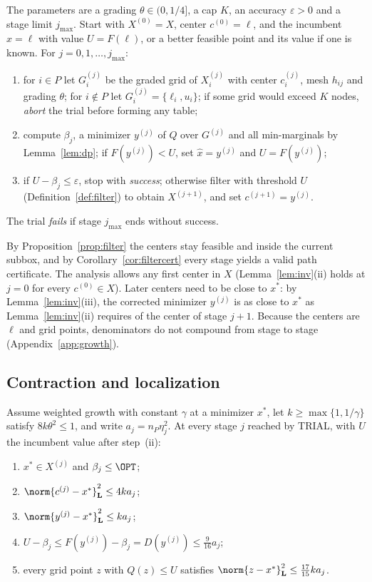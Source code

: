 \begin{algorithm}\label{alg:trial}
The parameters are a grading $\theta\in(0,1/4]$, a cap $K$, an accuracy
$\varepsilon>0$ and a stage limit $j_{\max}$. Start with $X^{(0)}=X$, center
$c^{(0)}=\ell$, and the incumbent $\hat x=\ell$ with value $U=F(\ell)$, or a
better feasible point and its value if one is known. For
$j=0,1,\dots,j_{\max}$:
\begin{enumerate}[label=(\roman*)]
\item for $i\in P$ let $G_i^{(j)}$ be the graded grid of $X_i^{(j)}$ with
center $c_i^{(j)}$, mesh $h_{ij}$ and grading $\theta$; for $i\notin P$ let
$G_i^{(j)}=\{\ell_i,u_i\}$; if some grid would exceed $K$ nodes,
\emph{abort} the trial before forming any table;
\item compute $\beta_j$, a minimizer $y^{(j)}$ of $Q$ over $G^{(j)}$ and all
min-marginals by Lemma~\ref{lem:dp}; if $F(y^{(j)})<U$, set
$\hat x=y^{(j)}$ and $U=F(y^{(j)})$;
\item if $U-\beta_j\le\varepsilon$, stop with \emph{success}; otherwise
filter with threshold $U$ (Definition~\ref{def:filter}) to obtain
$X^{(j+1)}$, and set $c^{(j+1)}=y^{(j)}$.
\end{enumerate}
The trial \emph{fails} if stage $j_{\max}$ ends without success.
\end{algorithm}

By Proposition~\ref{prop:filter} the centers stay feasible and inside the
current subbox, and by Corollary~\ref{cor:filtercert} every stage yields a
valid path certificate. The analysis allows any first center in $X$
(Lemma~\ref{lem:inv}(ii) holds at $j=0$ for every $c^{(0)}\in X$). Later
centers need to be close to $x^*$: by Lemma~\ref{lem:inv}(iii), the corrected
minimizer $y^{(j)}$ is as close to $x^*$ as Lemma~\ref{lem:inv}(ii) requires
of the center of stage $j+1$. Because the centers are $\ell$ and grid points,
denominators do not compound from stage to stage
(Appendix~\ref{app:growth}).

\subsection{Contraction and localization}

\begin{lemma}\label{lem:inv}
Assume weighted growth with constant $\gamma$ at a minimizer $x^*$, let
$k\ge\max\{1,1/\gamma\}$ satisfy $8k\theta^2\le1$, and write
$a_j=n_P\eta_j^2$. At every stage $j$ reached by TRIAL, with $U$ the
incumbent value after step~(ii):
\begin{enumerate}[label=(\roman*)]
\item $x^*\in X^{(j)}$ and $\beta_j\le\OPT$;
\item $\norm{c^{(j)}-x^*}_{\mathbf L}^2\le4ka_j$;
\item $\norm{y^{(j)}-x^*}_{\mathbf L}^2\le ka_j$;
\item $U-\beta_j\le F(y^{(j)})-\beta_j=D(y^{(j)})\le\frac9{16}a_j$;
\item every grid point $z$ with $Q(z)\le U$ satisfies
$\norm{z-x^*}_{\mathbf L}^2\le\frac{17}{15}ka_j$.
\end{enumerate}
\end{lemma}

